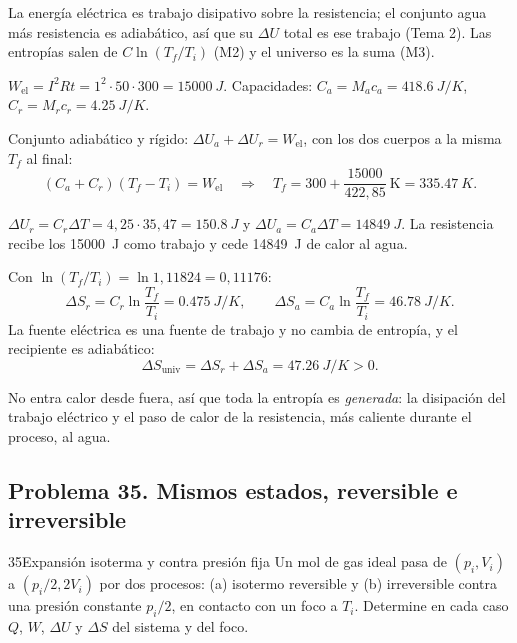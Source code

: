 \begin{resolucion}
\idea La energía eléctrica es trabajo disipativo sobre la resistencia; el conjunto agua más resistencia es
adiabático, así que su $\Delta U$ total es ese trabajo (Tema 2). Las entropías salen de $C\ln(T_f/T_i)$ (M2) y el
universo es la suma (M3).

 $W_{\mathrm{el}}=I^2Rt=1^2\cdot50\cdot300=\SI{15000}{J}$. Capacidades:
$C_a=M_ac_a=\SI{418,6}{J/K}$, $C_r=M_rc_r=\SI{4,25}{J/K}$.

 Conjunto adiabático y rígido: $\Delta U_a+\Delta U_r=W_{\mathrm{el}}$, con los dos
cuerpos a la misma $T_f$ al final:
\[
  (C_a+C_r)(T_f-T_i)=W_{\mathrm{el}}\quad\Longrightarrow\quad
  T_f=300+\frac{15000}{422{,}85}\ \mathrm K=\boxed{\SI{335,47}{K}}.
\]

 $\Delta U_r=C_r\Delta T=4{,}25\cdot35{,}47=\boxed{\SI{150,8}{J}}$ y
$\Delta U_a=C_a\Delta T=\boxed{\SI{14849}{J}}$. La resistencia recibe los \SI{15000}{J} como trabajo y cede
\SI{14849}{J} de calor al agua.

 Con $\ln(T_f/T_i)=\ln1{,}11824=0{,}11176$:
\[
  \Delta S_r=C_r\ln\frac{T_f}{T_i}=\boxed{\SI{0,475}{J/K}},\qquad
  \Delta S_a=C_a\ln\frac{T_f}{T_i}=\boxed{\SI{46,78}{J/K}}.
\]
La fuente eléctrica es una fuente de trabajo y no cambia de entropía, y el recipiente es adiabático:
\[
  \Delta S_{\mathrm{univ}}=\Delta S_r+\Delta S_a=\boxed{\SI{47,26}{J/K}}>0 .
\]
\end{resolucion}

\begin{observacion}
No entra calor desde fuera, así que toda la entropía es \emph{generada}: la disipación del trabajo eléctrico
y el paso de calor de la resistencia, más caliente durante el proceso, al agua.
\end{observacion}

\subsection{Problema 35. Mismos estados, reversible e irreversible}
\begin{problema}{35}{Expansión isoterma y contra presión fija}
Un mol de gas ideal pasa de $(p_i,V_i)$ a $(p_i/2,2V_i)$ por dos procesos: (a) isotermo reversible y (b)
irreversible contra una presión constante $p_i/2$, en contacto con un foco a $T_i$. Determine en cada caso $Q$, $W$,
$\Delta U$ y $\Delta S$ del sistema y del foco.
\end{problema}

